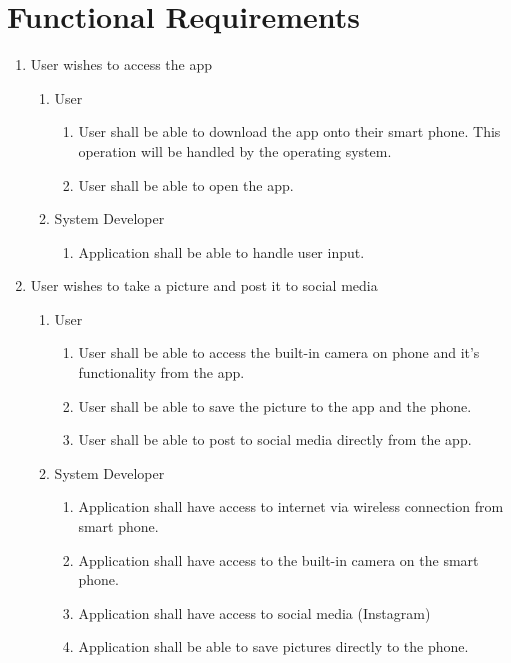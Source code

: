 \documentclass[]{article}
\begin{document}
\section{Functional Requirements}
\label{sec:functional_requirements}


\begin{enumerate}[{BE}1.]
	\item User wishes to access the app
	\begin{enumerate}[{VP1}.1]
		\item User
			\begin{enumerate}
				\item User shall be able to download the app onto their smart phone.  This operation will be handled by the operating system.
				\item User shall be able to open the app.
			\end{enumerate}
		\item System Developer
			\begin{enumerate}
				\item Application shall be able to handle user input.
			\end{enumerate}
	\end{enumerate}
	\item User wishes to take a picture and post it to social media
	\begin{enumerate}[{VP2}.1]
		\item User
			\begin{enumerate}
				\item User shall be able to access the built-in camera on phone and it's functionality from the app.
				\item User shall be able to save the picture to the app and the phone.
				\item User shall be able to post to social media directly from the app.
			\end{enumerate}
		\item System Developer
			\begin{enumerate}
				\item Application shall have access to internet via wireless connection from smart phone.
				\item Application shall have access to the built-in camera on the smart phone.
				\item Application shall have access to social media (Instagram)
				\item Application shall be able to save pictures directly to the phone.
			\end{enumerate}

\end{enumerate}
\end{enumerate}
\end{document}
